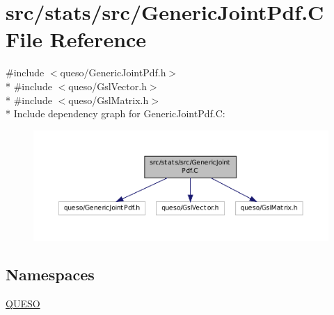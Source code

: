 \hypertarget{_generic_joint_pdf_8_c}{\section{src/stats/src/\-Generic\-Joint\-Pdf.C File Reference}
\label{_generic_joint_pdf_8_c}
}
{\ttfamily \#include $<$queso/\-Generic\-Joint\-Pdf.\-h$>$}\\*
{\ttfamily \#include $<$queso/\-Gsl\-Vector.\-h$>$}\\*
{\ttfamily \#include $<$queso/\-Gsl\-Matrix.\-h$>$}\\*
Include dependency graph for Generic\-Joint\-Pdf.\-C\-:
\nopagebreak
\begin{figure}[H]
\begin{center}
\leavevmode
\includegraphics[width=350pt]{_generic_joint_pdf_8_c__incl}
\end{center}
\end{figure}
\subsection*{Namespaces}
\begin{DoxyCompactItemize}
\item 
\hyperlink{namespace_q_u_e_s_o}{Q\-U\-E\-S\-O}
\end{DoxyCompactItemize}
